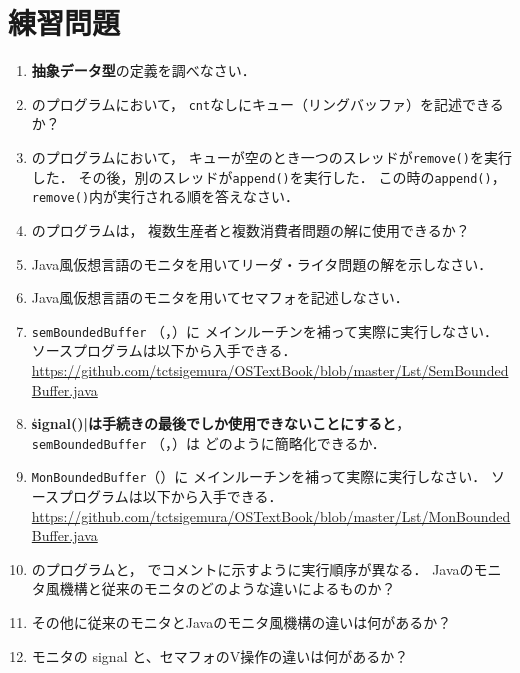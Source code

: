 \section*{練習問題}
\begin{enumerate}
\renewcommand{\labelenumi}{\tt \arabic{chapter}.\arabic{enumi}}
 \setlength{\leftskip}{1em}

\item {\bf 抽象データ型}の定義を調べなさい．

\item {}のプログラムにおいて，
{\tt cnt}なしにキュー（リングバッファ）を記述できるか？

\item {}のプログラムにおいて，
キューが空のとき一つのスレッドが{\tt remove()}を実行した．
その後，別のスレッドが{\tt append()}を実行した．
この時の{\tt append()}，{\tt remove()}内が実行される順を答えなさい．

\item {}のプログラムは，
複数生産者と複数消費者問題の解に使用できるか？

\item Java風仮想言語のモニタを用いてリーダ・ライタ問題の解を示しなさい．

\item Java風仮想言語のモニタを用いてセマフォを記述しなさい．

\item {\tt semBoundedBuffer}
（，）に
メインルーチンを補って実際に実行しなさい．
ソースプログラムは以下から入手できる． \\
\url{https://github.com/tctsigemura/OSTextBook/blob/master/Lst/SemBoundedBuffer.java}

\item {\bf \|signal()|は手続きの最後でしか使用できないことにすると}，
{\tt semBoundedBuffer}
（，）は
どのように簡略化できるか．

\item {\tt MonBoundedBuffer}（）に
メインルーチンを補って実際に実行しなさい．
ソースプログラムは以下から入手できる．\\
\url{https://github.com/tctsigemura/OSTextBook/blob/master/Lst/MonBoundedBuffer.java}

\item {}のプログラムと，
でコメントに示すように実行順序が異なる．
Javaのモニタ風機構と従来のモニタのどのような違いによるものか？

\item その他に従来のモニタとJavaのモニタ風機構の違いは何があるか？

\item モニタの signal と、セマフォのV操作の違いは何があるか？
\end{enumerate}
